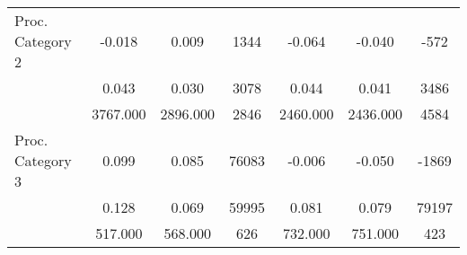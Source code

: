 \begin{table}[!htbp]
\begin{tabular}{lcccccc}
  Proc. Category 2 & -0.018 & 0.009 & 1344 & -0.064 & -0.040 & -572 \\ 
    & 0.043 & 0.030 & 3078 & 0.044 & 0.041 & 3486 \\ 
    & 3767.000 & 2896.000 & 2846 & 2460.000 & 2436.000 & 4584 \\ 
  Proc. Category 3 & 0.099 & 0.085 & 76083 & -0.006 & -0.050 & -1869 \\ 
    & 0.128 & 0.069 & 59995 & 0.081 & 0.079 & 79197 \\ 
    & 517.000 & 568.000 & 626 & 732.000 & 751.000 & 423 \\ 
   \hline
\hline
\end{tabular}
\endgroup
\end{table}

